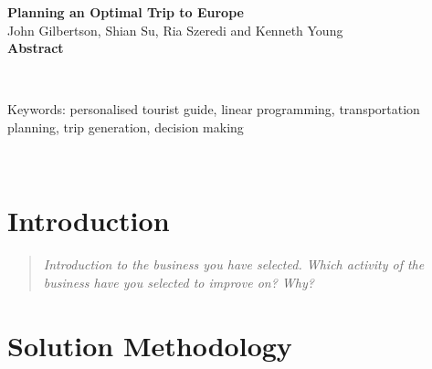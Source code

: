 \documentclass[12pt]{article}
\begin{document}
\clearpage
\vspace*{3cm}
\begin{center}
  {\large \bf Planning an Optimal Trip to Europe}\\[+10pt]
  John Gilbertson, Shian Su, Ria Szeredi and Kenneth Young\\[+10pt]
  {\large \bf Abstract}\\[+10pt]
  \parbox{13cm}{\lipsum[3]}
\\[+20pt]
\parbox{13cm}{
Keywords: personalised tourist guide, linear programming, transportation planning, trip generation, decision making}
\\[+20pt]
\end{center}
\vfill
\clearpage

\tableofcontents
\pagebreak


\section{Introduction}
\label{sec:intro}


\begin{quote} \textit{
Introduction to the business you have selected. Which activity of the business have you selected to
improve on? Why?
} \end{quote}

\lipsum[3]


\pagebreak

\section{Solution Methodology} 
\label{sec:methods}

\end{document}
